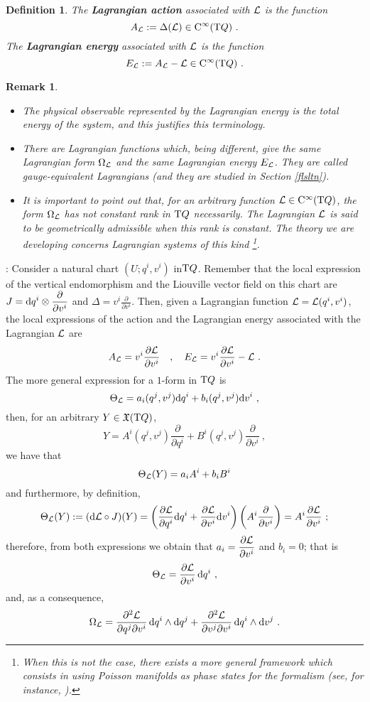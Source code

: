 \documentclass[12pt]{report}
\newtheorem{definition}[teor]{Definition}
\newtheorem{remark}[teor]{Remark}
\def\dst{\displaystyle}
\def\derpar#1#2{\frac{\partial{#1}}{\partial{#2}}}
\def\vf{\mathfrak X}
\def\Lag{{\cal L}}
\def\d{{\rm d}}
\def\Tan{{\rm T}}
\def\Cinfty{{\rm C}^\infty}
\begin{document}
\begin{definition}
The \textbf{Lagrangian action} associated with $\Lag$ is the function
$$
A_\Lag := \Delta (\Lag ) \in \Cinfty (\Tan Q) \ .
$$
The \textbf{Lagrangian energy} associated with $\Lag$ is the function
$$
E_\Lag := A_\Lag - \Lag \in \Cinfty (\Tan Q) \ .
$$
\end{definition}

\begin{remark}{\rm 
\begin{itemize}
\item
The physical observable represented by the Lagrangian energy 
is the total energy of the system, and this justifies this terminology. 
\item
There are Lagrangian functions which, being different, give the same
Lagrangian form $\Omega_{\Lag}$ and the same Lagrangian energy $ E_{\Lag}$.
They are called {\sl gauge-equivalent Lagrangians} (and they are studied in Section \ref{flsltn}).
\item
It is important to point out that, for an arbitrary function
$\Lag \in \Cinfty (\Tan Q)$, the form $\Omega_\Lag$
has not constant rank in $\Tan Q$ necessarily.
The Lagrangian $\Lag$ is said to be {\sl  geometrically admissible}
when this rank is constant.
The theory we are developing concerns Lagrangian systems of this kind
\footnote{
When this is not the case,
there exists a more general framework which consists in using {\sl Poisson manifolds} as phase states for the formalism (see, for instance, \cite{LM-sgam}).
}.
\end{itemize}
}\end{remark}

:
Consider a natural  chart $(U;q^i,v^i)$ in$\Tan Q$.
Remember that the local expression of the vertical endomorphism and 
the Liouville vector field on this chart are
$\displaystyle J = \d q^i\otimes \derpar{}{v^i}$ and
$\displaystyle \Delta = v^i\derpar{}{v^i}$. Then,
given a Lagrangian function $\Lag=\Lag (q^i,v^i)$,
the local expressions of the action and the Lagrangian energy associated with the Lagrangian $\Lag$ are 
$$
A_\Lag = v^i\derpar{\Lag}{v^i}
\quad , \quad
E_\Lag = v^i\derpar{\Lag}{v^i} - \Lag \ .
$$
The more general expression for a $1$-form in $\Tan Q$ is
$$
\Theta_\Lag = a_i(q^j,v^j) \d q^i + b_i(q^j,v^j) \d v^i \ ,
$$
then, for an arbitrary $Y\in\vf (\Tan Q)$,
$$
Y = A^i(q^j,v^j) \derpar{}{q^i} + B^i(q^j,v^j) \derpar{}{v^i} \ ,
$$
we have that
$$
\Theta_\Lag (Y) = a_iA^i +b_iB^i
$$
and furthermore, by definition,
$$
\Theta_\Lag (Y) := (\d \Lag \circ J)(Y) =
\left(\derpar{\Lag}{q^i}\d q^i + \derpar{\Lag}{v^i}\d v^i\right)
\left(A^i\derpar{}{v^i}\right)
=A^i \derpar{\Lag}{v^i} \ ;
$$
therefore, from both expressions we obtain that
\(\dst a_i = \derpar{\Lag}{v^i}\) and $b_i = 0$; that is
$$
\Theta_\Lag  = \derpar{\Lag}{v^i}\,\d q^i \ ,
$$
and, as a consequence,
$$
\Omega_\Lag  =
\frac{\partial^2\Lag}{\partial q^j \partial v^i}\, \d q^i \wedge \d q^j +
\frac{\partial^2\Lag}{\partial v^j \partial v^i}\, \d q^i \wedge \d v^j \ .
$$
\end{document}
